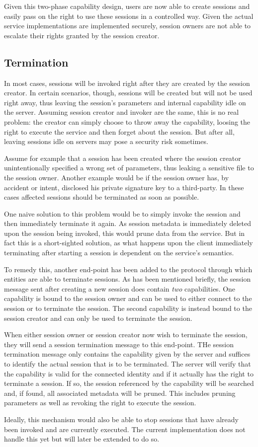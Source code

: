 Given this two-phase capability design, users are now able to create sessions and easily pass on the right to use these sessions in a controlled way.
Given the actual service implementations are implemented securely, session owners are not able to escalate their rights granted by the session creator.

\subsection{Termination}

In most cases, sessions will be invoked right after they are created by the session creator.
In certain scenarios, though, sessions will be created but will not be used right away, thus leaving the session's parameters and internal capability idle on the server.
Assuming session creator and invoker are the same, this is no real problem: the creator can simply choose to throw away the capability, loosing the right to execute the service and then forget about the session.
But after all, leaving sessions idle on servers may pose a security risk sometimes.

Assume for example that a session has been created where the session creator unintentionally specified a wrong set of parameters, thus leaking a sensitive file to the session owner.
Another example would be if the session owner has, by accident or intent, disclosed his private signature key to a third-party.
In these cases affected sessions should be terminated as soon as possible.

One naive solution to this problem would be to simply invoke the session and then immediately terminate it again.
As session metadata is immediately deleted upon the session being invoked, this would prune data from the service.
But in fact this is a short-sighted solution, as what happens upon the client immediately terminating after starting a session is dependent on the service's semantics.

To remedy this, another end-point has been added to the protocol through which entities are able to terminate sessions.
As has been mentioned briefly, the session message sent after creating a new session does contain \emph{two} capabilities.
One capability is bound to the session owner and can be used to either connect to the session or to terminate the session.
The second capability is instead bound to the session creator and can only be used to terminate the session.

When either session owner or session creator now wish to terminate the session, they will send a session termination message to this end-point.
THe session termination message only contains the capability given by the server and suffices to identify the actual session that is to be terminated.
The server will verify that the capability is valid for the connected identity and if it actually has the right to terminate a session.
If so, the session referenced by the capability will be searched and, if found, all associated metadata will be pruned.
This includes pruning parameters as well as revoking the right to execute the session.

Ideally, this mechanism would also be able to stop sessions that have already been invoked and are currently executed.
The current implementation does not handle this yet but will later be extended to do so.

